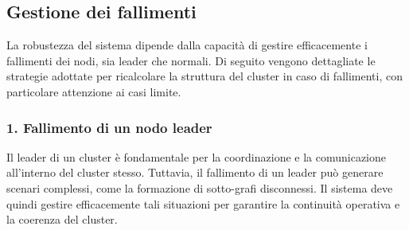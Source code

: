 \documentclass[12pt, a4paper]{report}
\begin{document}
\subsection{Gestione dei fallimenti}\label{subsec:gestione_fallimenti}

La robustezza del sistema dipende dalla capacit\`a di gestire efficacemente i fallimenti dei nodi, sia leader che normali. Di seguito vengono dettagliate le strategie adottate per ricalcolare la struttura del cluster in caso di fallimenti, con particolare attenzione ai casi limite.

\subsubsection{1. Fallimento di un nodo leader}
\label{subsubsec:fallimento_leader}
Il leader di un cluster \`e fondamentale per la coordinazione e la comunicazione all'interno del cluster stesso. Tuttavia, il fallimento di un leader pu\`o generare scenari complessi, come la formazione di sotto-grafi disconnessi. Il sistema deve quindi gestire efficacemente tali situazioni per garantire la continuit\`a operativa e la coerenza del cluster.
\end{document}
